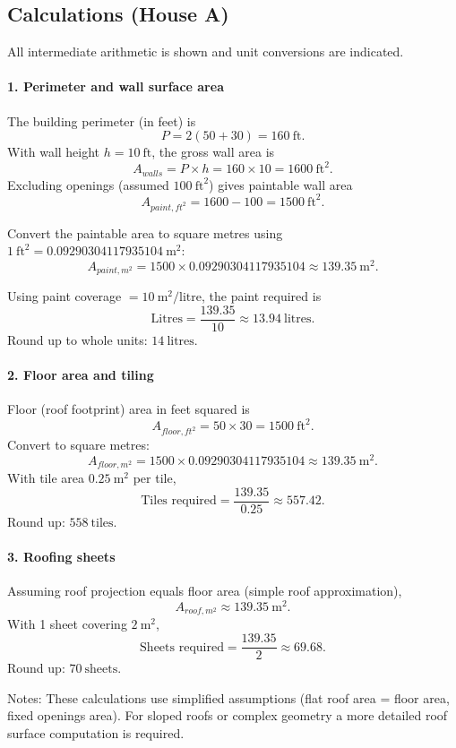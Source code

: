 \documentclass[12pt,a4paper,openany,titlepage,reqno, final]{report}
\theoremstyle{definition}
\begin{document}
	\subsection{Calculations (House A)}
	All intermediate arithmetic is shown and unit conversions are indicated.
	
	\paragraph{1. Perimeter and wall surface area}
	The building perimeter (in feet) is
	\[
	P = 2(50 + 30) = 160\ \text{ft}.
	\]
	With wall height $h=10\ \text{ft}$, the gross wall area is
	\[
	A_{walls} = P\times h = 160\times10 = 1600\ \text{ft}^2.
	\]
	Excluding openings (assumed $100\ \text{ft}^2$) gives paintable wall area
	\[
	A_{paint,ft^2} = 1600 - 100 = 1500\ \text{ft}^2.
	\]
	
	Convert the paintable area to square metres using $1\ \text{ft}^2 = 0.09290304117935104\ \text{m}^2$:
	\[
	A_{paint,m^2} = 1500\times0.09290304117935104 \approx 139.35\ \text{m}^2.
	\]
	
	Using paint coverage $=10\ \text{m}^2/\text{litre}$, the paint required is
	\[
	\text{Litres} = \frac{139.35}{10} \approx 13.94\ \text{litres}.
	\]
	Round up to whole units: \(\boxed{14\ \text{litres}}\).
	
	\paragraph{2. Floor area and tiling}
	Floor (roof footprint) area in feet squared is
	\[
	A_{floor,ft^2} = 50\times30 = 1500\ \text{ft}^2.
	\]
	Convert to square metres:
	\[
	A_{floor,m^2} = 1500\times0.09290304117935104 \approx 139.35\ \text{m}^2.
	\]
	With tile area $0.25\ \text{m}^2$ per tile,
	\[
	\text{Tiles required} = \frac{139.35}{0.25} \approx 557.42.
	\]
	Round up: \(\boxed{558\ \text{tiles}}\).
	
	\paragraph{3. Roofing sheets}
	Assuming roof projection equals floor area (simple roof approximation),
	\[
	A_{roof,m^2} \approx 139.35\ \text{m}^2.
	\]
	With 1 sheet covering $2\ \text{m}^2$,
	\[
	\text{Sheets required} = \frac{139.35}{2} \approx 69.68.
	\]
	Round up: \(\boxed{70\ \text{sheets}}\).
	
	\vspace{4pt}
	Notes: These calculations use simplified assumptions (flat roof area = floor area, fixed openings area). For sloped roofs or complex geometry a more detailed roof surface computation is required.
	
\end{document}
